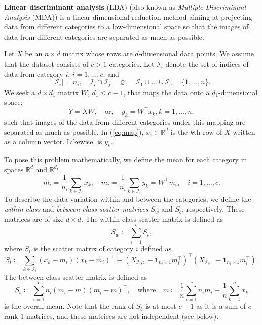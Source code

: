 \documentclass{../kin_math}
\begin{document}
\begin{questions}
  \question \textbf{Linear discriminant analysis} (LDA) (also known as \emph{Multiple Discriminant Analysis} (MDA)) is a linear dimensional reduction method aiming at projecting data from different categories to a low-dimensional space so that the images of data from different categories are separated as much as possible.

  Let $X$ be an $n \times d$ matrix whose rows are $d$-dimensional data points. We assume that the dataset consists of $c > 1$ categories. Let $\mathcal{I}_i$ denote the set of indices of data from category $i$, $i = 1, \dots , c$, and
  \begin{equation*}
    |\mathcal{I}_i| = n_i, \quad \mathcal{I}_i \cap \mathcal{I}_j = \varnothing, \quad \mathcal{I}_1 \cup \dots \cup \mathcal{I}_c = \{1, \dots, n\}.
  \end{equation*}
  We seek a $d \times d_1$ matrix $W$, $d_1 \leq c - 1$, that maps the data onto a $d_1$-dimensional space:
  \begin{equation}
    \label{eq:map}
    Y = XW, \quad \text{or}, \quad y_k = W^\top x_k, k = 1, \dots, n,
  \end{equation}
  such that images of the data from different categories under this mapping are separated as much as possible. In (\ref{eq:map}), $x_i \in \mathbb{R}^d$ is the $k$th row of $X$ written as a column vector. Likewise, is $y_k$.

  To pose this problem mathematically, we define the mean for each category in spaces $\mathbb{R}^d$ and $\mathbb{R}^{d_1}$,
  \begin{equation}
    m_i = \frac{1}{n_i} \sum_{k \in \mathcal{I}_i} x_k, \quad \tilde{m}_i = \frac{1}{n_i} \sum_{k \in \mathcal{I}_i} y_k = W^\top m_i, \quad i = 1, \dots, c.
  \end{equation}
  To describe the data variation within and between the categories, we define the \emph{within-class} and \emph{between-class scatter matrices} $S_w$ and $S_b$, respectively. These matrices are of size $d \times d$. The within-class scatter matrix is defined as
  \begin{equation}
    S_w \coloneqq \sum_{i = 1}^c S_i,
  \end{equation}
  where $S_i$ is the scatter matrix of category $i$ defined as
  \begin{equation}
    S_i \coloneqq \sum_{k \in \mathcal{I}_i} (x_k - m_i)(x_k - m_i)^\top \equiv (X_{\mathcal{I}_i,  :} - \textbf{1}_{n_i \times 1} m_i^\top)^\top (X_{\mathcal{I}_i, :} - \textbf{1}_{n_i \times 1} m_i^\top).
  \end{equation}
  The between-class scatter matrix is defined as
  \begin{equation}
    S_b \coloneqq \sum_{i = 1}^c n_i (m_i - m) (m_i - m)^\top, \quad \text{where} \quad m \coloneqq \frac{1}{n} \sum_{i = 1}^c n_i m_i \equiv \frac{1}{n} \sum_{k = 1}^n x_k
  \end{equation}
  is the overall mean. Note that the rank of $S_b$ is at most $c - 1$ as it is a sum of $c$ rank-1 matrices, and these matrices are not independent (see below).


\end{questions}
\end{document}
